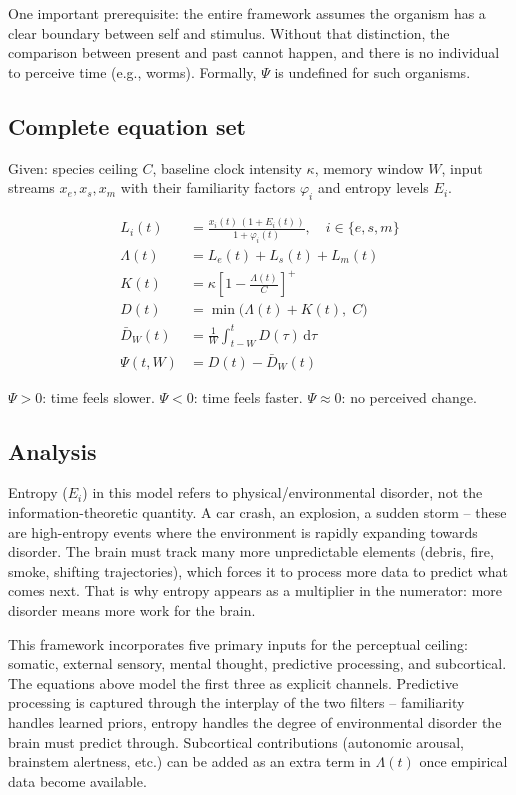 \documentclass[11pt,a4paper]{article}
\begin{document}
One important prerequisite: the entire framework assumes the organism has a clear boundary between self and stimulus. Without that distinction, the comparison between present and past cannot happen, and there is no individual to perceive time (e.g., worms). Formally, $\Psi$ is undefined for such organisms.

\subsection{Complete equation set}

Given: species ceiling $C$, baseline clock intensity $\kappa$, memory window $W$, input streams $x_e, x_s, x_m$ with their familiarity factors $\varphi_i$ and entropy levels $E_i$.

\begin{align}
	L_i(t) &= \frac{x_i(t)\,(1+E_i(t))}{1+\varphi_i(t)},
	\quad i\in\{e,s,m\}
	\tag{1}\\[6pt]
	\Lambda(t) &= L_e(t)+L_s(t)+L_m(t)
	\tag{2}\\[6pt]
	K(t) &= \kappa\left[1-\frac{\Lambda(t)}{C}\right]^{+}
	\tag{3}\\[6pt]
	D(t) &= \min\!\bigl(\Lambda(t)+K(t),\; C\bigr)
	\tag{4}\\[6pt]
	\bar{D}_W(t) &= \frac{1}{W}\int_{t-W}^{t}D(\tau)\,\mathrm{d}\tau
	\tag{5}\\[6pt]
	\Psi(t,W) &= D(t) - \bar{D}_W(t)
	\tag{6}
\end{align}

\medskip
$\Psi > 0$: time feels slower. \quad
$\Psi < 0$: time feels faster. \quad
$\Psi \approx 0$: no perceived change.

\subsection{Analysis}

Entropy ($E_i$) in this model refers to physical/environmental disorder, not the information-theoretic quantity. A car crash, an explosion, a sudden storm -- these are high-entropy events where the environment is rapidly expanding towards disorder. The brain must track many more unpredictable elements (debris, fire, smoke, shifting trajectories), which forces it to process more data to predict what comes next. That is why entropy appears as a multiplier in the numerator: more disorder means more work for the brain.

This framework incorporates five primary inputs for the perceptual ceiling: somatic, external sensory, mental thought, predictive processing, and subcortical. The equations above model the first three as explicit channels. Predictive processing is captured through the interplay of the two filters -- familiarity handles learned priors, entropy handles the degree of environmental disorder the brain must predict through. Subcortical contributions (autonomic arousal, brainstem alertness, etc.) can be added as an extra term in $\Lambda(t)$ once empirical data become available.
\end{document}
